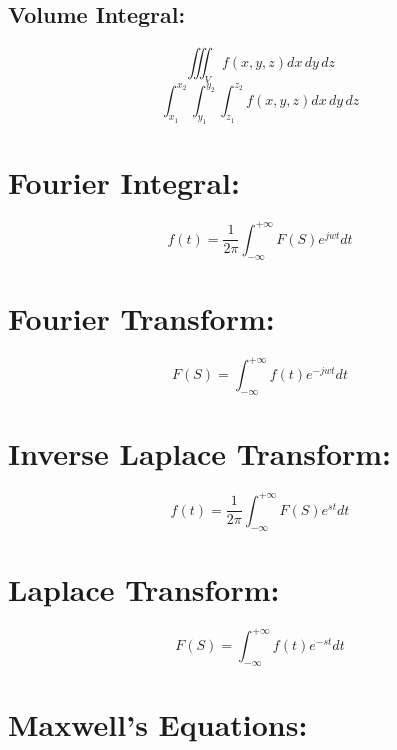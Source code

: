 \documentclass[12 pt,a4paper]{report}
\begin{document}
\subsection{Volume Integral: }
\begin{equation}
\iiint_{V}f(x,y,z)dx\,dy\,dz
\end{equation}
\begin{equation}
\int_{x_{1}}^{x_{2}}\int_{y_{1}}^{y_{2}}\int_{z_{1}}^{z_{2}} f(x,y,z)dx\,dy\,dz
\end{equation}
\section{Fourier Integral:}
\begin{equation}
f(t)=\frac{1}{2\pi}\int_{-\infty}^{+\infty}F(S)e^{jwt}dt
\end{equation}
\section{Fourier Transform:}
\begin{equation}
F(S)=\int_{-\infty}^{+\infty}f(t)e^{-jwt}dt
\end{equation}
\section{Inverse Laplace Transform:}
\begin{equation}
f(t)=\frac{1}{2\pi}\int_{-\infty}^{+\infty}F(S)e^{st}dt
\end{equation}
\section{Laplace Transform:}
\begin{equation}
F(S)=\int_{-\infty}^{+\infty}f(t)e^{-st}dt
\end{equation}
\section{Maxwell's Equations:}
\end{document}
